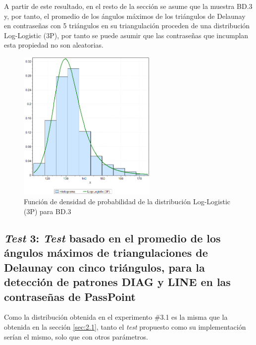 \documentclass[12pt]{report}
\begin{document}
A partir de este resultado, en el resto de la sección se asume que la muestra  BD.3 y, por tanto, el promedio de los ángulos máximos de los triángulos de Delaunay en contraseñas con 5 triángulos en su triangulación  proceden de una distribución Log-Logistic (3P), por tanto se puede asumir que las contraseñas que incumplan esta propiedad no son aleatorias.
\begin{figure}[ht]
	\centering
	
	\includegraphics[width=0.6\textwidth]{5td_fdp.png}
	\caption{Función de densidad de probabilidad de la  distribución Log-Logistic (3P) para BD.3}
	\label{5TD_FDP}
\end{figure}

\newpage
\subsection{\textit{Test} 3: \textit{Test} basado en el promedio de los ángulos máximos de triangulaciones de Delaunay con cinco triángulos, para la detección de patrones DIAG y LINE en las contraseñas de PassPoint}
\label{sec:3.2}

Como la distribución   obtenida en el experimento \#3.1 es la misma que la obtenida en la sección \ref{sec:2.1}, tanto el \textit{test} propuesto como su implementación  serían el mismo, solo que con otros parámetros.

\end{document}
